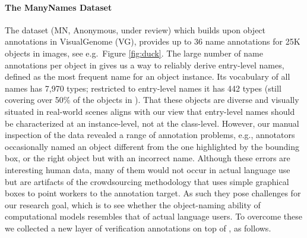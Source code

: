 \paragraph{The ManyNames Dataset}
The \mn dataset (MN, Anonymous, under review) which builds upon object annotations in VisualGenome (VG), provides up to 36 name annotations for 25K objects in images, see e.g.\ Figure \ref{fig:duck}.
The large number of name annotations per object in \mn gives us a way to reliably derive entry-level names, defined as the most frequent name for an object instance.
Its vocabulary of all names has 7,970 types; restricted to entry-level names it has 442 types (still covering over 50\% of the objects in \vg).
That these objects are diverse and visually situated in real-world scenes aligns with our view that entry-level names should be characterized at an instance-level, not at the class-level.
However, our manual inspection of the \mn data revealed a range of annotation problems, e.g., annotators occasionally named an object different from the one highlighted by the bounding box, or the right object but with an incorrect name.
Although these errors are interesting human data, many of them would not occur in actual language use but are artifacts of the crowdsourcing methodology that uses simple graphical boxes to point workers to the annotation target.
As such they pose challenges for our research goal, which is to see whether the object-naming ability of computational models resembles that of actual language users.
To overcome these we collected a new layer of verification annotations on top of \mn, as follows.


